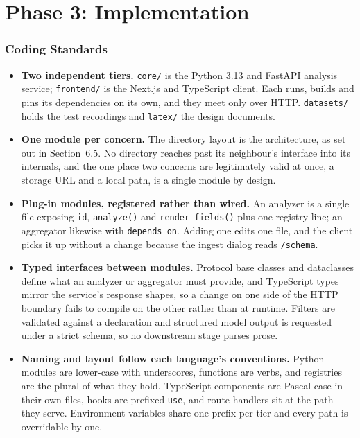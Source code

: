 \documentclass[11pt,a4paper]{article}
\begin{document}
\part{Phase 3: Implementation}

\section{Coding Standards}

\begin{itemize}
  \item \textbf{Two independent tiers.} \texttt{core/} is the Python 3.13 and
        FastAPI analysis service; \texttt{frontend/} is the Next.js and
        TypeScript client. Each runs, builds and pins its dependencies on its
        own, and they meet only over HTTP. \texttt{datasets/} holds the test
        recordings and \texttt{latex/} the design documents.

  \item \textbf{One module per concern.} The directory layout is the
        architecture, as set out in Section~6.5. No directory reaches past its
        neighbour's interface into its internals, and the one place two concerns
        are legitimately valid at once, a storage URL and a local path, is a
        single module by design.

  \item \textbf{Plug-in modules, registered rather than wired.} An analyzer is a
        single file exposing \texttt{id}, \texttt{analyze()} and
        \texttt{render\_fields()} plus one registry line; an aggregator likewise
        with \texttt{depends\_on}. Adding one edits one file, and the client
        picks it up without a change because the ingest dialog reads
        \texttt{/schema}.

  \item \textbf{Typed interfaces between modules.} Protocol base classes and
        dataclasses define what an analyzer or aggregator must provide, and
        TypeScript types mirror the service's response shapes, so a change on one
        side of the HTTP boundary fails to compile on the other rather than at
        runtime. Filters are validated against a declaration and structured
        model output is requested under a strict schema, so no downstream stage
        parses prose.

  \item \textbf{Naming and layout follow each language's conventions.} Python
        modules are lower-case with underscores, functions are verbs, and
        registries are the plural of what they hold. TypeScript components are
        Pascal case in their own files, hooks are prefixed \texttt{use}, and
        route handlers sit at the path they serve. Environment variables share
        one prefix per tier and every path is overridable by one.


\end{itemize}
\end{document}
